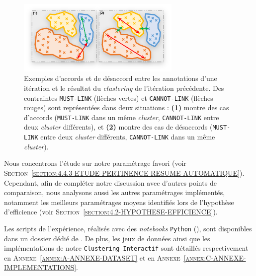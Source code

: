 			\begin{figure}[!htb]
				\centering
				\includegraphics[width=0.70\textwidth]{figures/example-accord-annotation-clustering}
				\caption{
					Exemples d'accords et de désaccord entre les annotations d'une itération et le résultat du \textit{clustering} de l'itération précédente.
					Des contraintes \texttt{MUST-LINK} (flèches vertes) et \texttt{CANNOT-LINK} (flèches rouges) sont représentées dans deux situations : \textbf{(1)} montre des cas d'accords (\texttt{MUST-LINK} dans un même \textit{cluster}, \texttt{CANNOT-LINK} entre deux \textit{cluster} différents), et \textbf{(2)} montre des cas de désaccords (\texttt{MUST-LINK} entre deux \textit{cluster} différents, \texttt{CANNOT-LINK} dans un même \textit{cluster}).
				}
				\label{figure:4.5.1-ETUDE-RENTABILITE-ACCORD-ANNOTATION-CLUSTERING-EXEMPLE}
			\end{figure}
			
			\begin{leftBarIdea}
				Nous concentrons l'étude sur notre paramétrage favori (voir \textsc{Section~\ref{section:4.4.3-ETUDE-PERTINENCE-RESUME-AUTOMATIQUE}}).
				Cependant, afin de compléter notre discussion avec d'autres points de comparaison, nous analysons aussi les autres paramétrages implémentés, notamment les meilleurs paramétrages moyens identifiés lors de l'hypothèse d'efficience (voir \textsc{Section~\ref{section:4.2-HYPOTHESE-EFFICIENCE}}).
			\end{leftBarIdea}
			
			\begin{leftBarInformation}
				Les scripts de l'expérience, réalisés avec des \textit{notebooks} \texttt{Python} (\cite{van-rossum-drake:2009:python-reference-manual}), sont disponibles dans un dossier dédié de \cite{schild:2021:cognitivefactory-interactiveclusteringcomparativestudy}.
				De plus, les jeux de données ainsi que les implémentations de notre \texttt{Clustering Interactif} sont détaillés respectivement en \textsc{Annexe~\ref{annex:A-ANNEXE-DATASET}} et en \textsc{Annexe~\ref{annex:C-ANNEXE-IMPLEMENTATIONS}}.
			\end{leftBarInformation}

